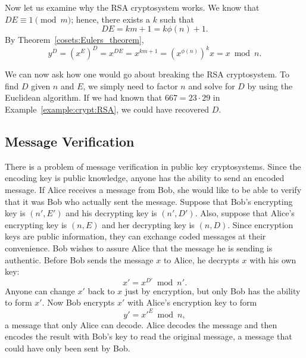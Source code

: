  
Now let us examine why the RSA cryptosystem works.  We know that $DE
\equiv 1 \pmod{ m}$; hence, there exists a $k$ such that 
\[
DE = km + 1 = k \phi(n) + 1.
\]
By Theorem~\ref{cosets:Eulers_theorem},
\[
y^D = (x^E)^D = x^{DE} = x^{km+1} = (x^{\phi(n)})^k x = x \bmod n.
\]
 
 
We can now ask how one would go about breaking the RSA cryptosystem.
To find $D$ given $n$ and $E$, we simply need to factor $n$ and solve
for $D$ by using the Euclidean algorithm. If we had known that $667 =
23 \cdot 29$ in Example~\ref{example:crypt:RSA}, we could have recovered $D$.    
 
 
 
\subsection*{Message Verification}
 
 
There is a problem of message verification in public key
cryptosystems. Since the encoding key is public knowledge, anyone has
the ability to send an encoded message.  If Alice receives a message
from Bob, she would like to be able to verify that it was Bob who
actually sent the message. Suppose that Bob's encrypting key is $(n',
E')$ and his decrypting key is $(n', D')$.  Also, suppose that Alice's
encrypting key is $(n, E)$ and her decrypting key is $(n, D)$.  Since
encryption keys are public information, they can exchange coded
messages at their convenience.  Bob wishes to assure Alice that the
message he is sending is authentic. Before Bob sends the message $x$
to Alice, he decrypts  $x$ with his own key:
\[
x' = x ^{D'} \bmod n'.
\]
Anyone can change $x'$ back to $x$ just by encryption, but only Bob
has the ability to form $x'$. Now Bob encrypts $x'$ with Alice's
encryption key to form 
\[
y' = {x'}^E  \bmod n,
\]
a message that only Alice can decode.  Alice decodes the message and
then encodes the result with Bob's key to read the original message, a
message that could have only been sent by Bob.
 
 
 
\histhead
 
